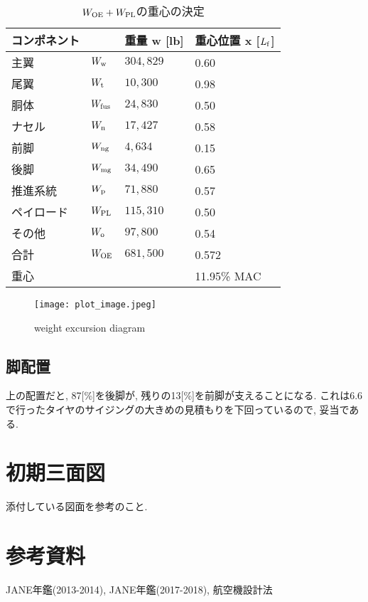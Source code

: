 \documentclass[12pt]{jsarticle}
\begin{document}
\begin{table}[H]
	\caption{$W_{\rm OE} + W_{\rm PL}$の重心の決定}
	\begin{center}
		\begin{tabular}{p{2cm} p{2cm} p{3cm} p{3cm}} \hline
			 コンポネント  & & 重量 w [lb] & 重心位置 x [$L_{\rm f}$] \\ \hline \hline
			主翼 & $W_{\rm w}$ & $304,829$ & 0.60 \\
			尾翼 & $W_{\rm t}$ & $10,300$ & 0.98 \\
			胴体 & $W_{\rm fus}$ & $24,830$ & 0.50 \\
			ナセル & $W_{\rm n}$ & $17,427$ & 0.58 \\
			前脚 & $W_{\rm ng}$ & $4,634$ & 0.15 \\
			後脚 & $W_{\rm mg}$ & $34,490$ & 0.65 \\
			推進系統 & $W_{\rm p}$ & $71,880$ & 0.57 \\
			ペイロード & $W_{\rm PL}$ & $115,310$ & 0.50 \\
			その他 & $W_{\rm o}$ & $97,800$ & 0.54 \\ \hline
			合計 & $W_{\rm OE}$ & $681,500$ & 0.572 \\ \hline \hline
			重心 & & & 11.95\% MAC \\ \hline
		\end{tabular}
	\end{center}
\end{table}

\begin{figure}[H]
\begin{center}
\texttt{[image: plot\_image.jpeg]}
\caption{weight excursion diagram}
\end{center}
\end{figure}

\subsection{脚配置}
上の配置だと, 87[\%]を後脚が, 残りの13[\%]を前脚が支えることになる. これは6.6で行ったタイヤのサイジングの大きめの見積もりを下回っているので, 妥当である. 

\section{初期三面図}
添付している図面を参考のこと.
\section*{参考資料}
JANE年鑑(2013-2014), JANE年鑑(2017-2018), 航空機設計法
\end{document}
